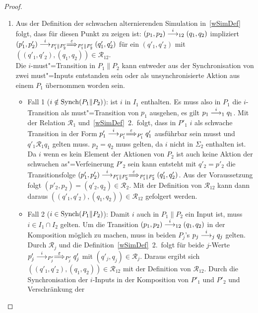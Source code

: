 \begin{proof}
\begin{enumerate}
    \item Aus der Definition der schwachen alternierenden
      Simulation in~\ref{wSimDef} folgt, dass für diesen Punkt zu zeigen ist:
      $(p_1,p_2)\must[i]_{12}(q_1,q_2)$ impliziert $(p'_1,p'_2)
      \must[i]_{P'_1\|P'_2} \weakmust[\varepsilon]_{P'_1\|P'_2} (q'_1,q'_2)$
      für ein $(q'_1,q'_2)$ mit $((q'_1,q'_2),(q_1,q_2)) \in
      \mathcal{R}_{12}$.\\
      Die $i$-must"=Transition in $P_1\|P_2$ kann entweder aus der
      Synchronisation von zwei must"=Inputs entstanden sein oder als
      unsynchronisierte Aktion aus einem $P_1$ übernommen worden sein.
      \begin{itemize}
        \item Fall 1 ($i\notin\mathrm{Synch} (P_1\|P_2)$): \OBdA{} ist $i$ in $I_1$
          enthalten. Es muss also in $P_1$ die $i$-Transition als
          must"=Transition von $p_1$ ausgehen, es gilt $p_1\must[i]_1 q_1$. Mit
          der Relation $\mathcal{R}_1$ und~\ref{wSimDef}~2.\ folgt, dass in
          $P'_1$ $i$ als schwache Transition in der Form $p'_1\must[i]_{P'_1}
          \weakmust[\varepsilon]_{P'_1}q'_1$ ausführbar sein musst und $q'_1
          \mathcal{R}_1q_1$ gelten muss. $p_2=q_2$ muss gelten, da $i$ nicht in
          $\Sigma _2$ enthalten ist. Da $i$ wenn es kein Element der Aktionen
          von $P_2$ ist auch keine Aktion der schwachen as"=Verfeinerung $P'_2$
          sein kann entsteht mit $q'_2=p'_2$ die Transitionsfolge $(p'_1,p'_2)
          \must[i]_{P'_1\|P'_2} \weakmust[\varepsilon]_{P'_1\|P'_2}
          (q'_1,q'_2)$. Aus der Voraussetzung folgt $(p'_2,p_2) = (q'_2,q_2)
          \in \mathcal{R}_2$. Mit der Definition von $\mathcal{R}_{12}$ kann
          dann daraus $((q'_1,q'_2),(q_1,q_2)) \in \mathcal{R}_{12}$ gefolgert
          werden.
        \item Fall 2 ($i\in\mathrm{Synch} (P_1\|P_2)$): Damit $i$ auch in $P_1\|P_2$
          ein Input ist, muss $i\in I_1\cap I_2$ gelten. Um die Transition
          $(p_1,p_2)\must[i]_{12}(q_1,q_2)$ in der Komposition möglich zu
          machen, muss in beiden $P_j$'s $p_j\must[i]_j q_j$ gelten. Durch
          $\mathcal{R}_j$ und die Definition~\ref{wSimDef}~2.\ folgt für beide
          $j$-Werte $p'_j\must[i]_{P'_j} \weakmust[\varepsilon]_{P'_j}q'_j$ mit
          $(q'_j,q_j)\in\mathcal{R}_j$. Daraus ergibt sich
          $((q'_1,q'_2),(q_1,q_2)) \in \mathcal{R}_{12}$ mit der Definition von
          $\mathcal{R}_{12}$. Durch die Synchronisation der $i$-Inputs in der
          Komposition von $P'_1$ und $P'_2$ und Verschränkung der

\end{itemize}
\end{enumerate}
\end{proof}
